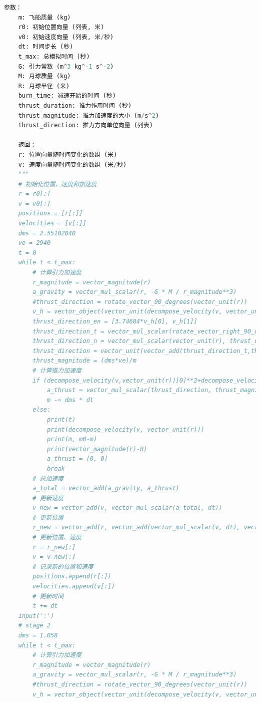 \documentclass{ctexart}
\begin{document}
\begin{lstlisting}[language=Python, caption={主代码}, xleftmargin=0pt]
    参数：
    m: 飞船质量 (kg)
    r0: 初始位置向量 (列表, 米)
    v0: 初始速度向量 (列表, 米/秒)
    dt: 时间步长 (秒)
    t_max: 总模拟时间 (秒)
    G: 引力常数 (m^3 kg^-1 s^-2)
    M: 月球质量 (kg)
    R: 月球半径 (米)
    burn_time: 减速开始的时间 (秒)
    thrust_duration: 推力作用时间 (秒)
    thrust_magnitude: 推力加速度的大小 (m/s^2)
    thrust_direction: 推力方向单位向量 (列表)

    返回：
    r: 位置向量随时间变化的数组 (米)
    v: 速度向量随时间变化的数组 (米/秒)
    """
    # 初始化位置、速度和加速度
    r = r0[:]
    v = v0[:]
    positions = [r[:]]
    velocities = [v[:]]
    dms = 2.55102040
    ve = 2940
    t = 0
    while t < t_max:
        # 计算引力加速度
        r_magnitude = vector_magnitude(r)
        a_gravity = vector_mul_scalar(r, -G * M / r_magnitude**3)
        #thrust_direction = rotate_vector_90_degrees(vector_unit(r))
        v_h = vector_object(vector_unit(decompose_velocity(v, vector_unit(r))))
        thrust_direction_en = [3.74684*v_h[0], v_h[1]]
        thrust_direction_t = vector_mul_scalar(rotate_vector_right_90_degrees(vector_unit(r)), thrust_direction_en[1])
        thrust_direction_n = vector_mul_scalar(vector_unit(r), thrust_direction_en[0])
        thrust_direction = vector_unit(vector_add(thrust_direction_t,thrust_direction_n))
        thrust_magnitude = (dms*ve)/m
        # 计算推力加速度
        if (decompose_velocity(v,vector_unit(r))[0]**2+decompose_velocity(v,vector_unit(r))[1]**2)**0.5 > 57:
            a_thrust = vector_mul_scalar(thrust_direction, thrust_magnitude)
            m -= dms * dt
        else:
            print(t)
            print(decompose_velocity(v, vector_unit(r)))
            print(m, m0-m)
            print(vector_magnitude(r)-R)
            a_thrust = [0, 0]
            break
        # 总加速度
        a_total = vector_add(a_gravity, a_thrust)
        # 更新速度
        v_new = vector_add(v, vector_mul_scalar(a_total, dt))
        # 更新位置
        r_new = vector_add(r, vector_add(vector_mul_scalar(v, dt), vector_mul_scalar(a_total, 0.5 * dt**2)))
        # 更新位置、速度
        r = r_new[:]
        v = v_new[:]
        # 记录新的位置和速度
        positions.append(r[:])
        velocities.append(v[:])
        # 更新时间
        t += dt
    input(':')
    # stage 2
    dms = 1.058
    while t < t_max:
        # 计算引力加速度
        r_magnitude = vector_magnitude(r)
        a_gravity = vector_mul_scalar(r, -G * M / r_magnitude**3)
        #thrust_direction = rotate_vector_90_degrees(vector_unit(r))
        v_h = vector_object(vector_unit(decompose_velocity(v, vector_unit(r))))

\end{lstlisting}
\end{document}
